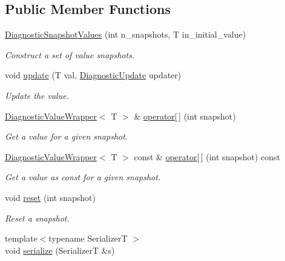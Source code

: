 \subsection*{Public Member Functions}
\begin{DoxyCompactItemize}
\item 
\hyperlink{structvt_1_1runtime_1_1component_1_1detail_1_1_diagnostic_snapshot_values_aed694eb0b124fda6f746855e83965a95}{Diagnostic\+Snapshot\+Values} (int n\+\_\+snapshots, T in\+\_\+initial\+\_\+value)
\begin{DoxyCompactList}\small\item\em Construct a set of value snapshots. \end{DoxyCompactList}\item 
void \hyperlink{structvt_1_1runtime_1_1component_1_1detail_1_1_diagnostic_snapshot_values_aeb6c8d74a72eba5610ba7d2ba966b91f}{update} (T val, \hyperlink{namespacevt_1_1runtime_1_1component_a896637e6e183a909a17bfd8d3943c206}{Diagnostic\+Update} updater)
\begin{DoxyCompactList}\small\item\em Update the value. \end{DoxyCompactList}\item 
\hyperlink{structvt_1_1runtime_1_1component_1_1detail_1_1_diagnostic_value_wrapper}{Diagnostic\+Value\+Wrapper}$<$ T $>$ \& \hyperlink{structvt_1_1runtime_1_1component_1_1detail_1_1_diagnostic_snapshot_values_a40036bbc9c217da754036c58bcce91b5}{operator\mbox{[}$\,$\mbox{]}} (int snapshot)
\begin{DoxyCompactList}\small\item\em Get a value for a given snapshot. \end{DoxyCompactList}\item 
\hyperlink{structvt_1_1runtime_1_1component_1_1detail_1_1_diagnostic_value_wrapper}{Diagnostic\+Value\+Wrapper}$<$ T $>$ const  \& \hyperlink{structvt_1_1runtime_1_1component_1_1detail_1_1_diagnostic_snapshot_values_a59ea89a8ada16ca5e96e10f418647963}{operator\mbox{[}$\,$\mbox{]}} (int snapshot) const
\begin{DoxyCompactList}\small\item\em Get a value as const for a given snapshot. \end{DoxyCompactList}\item 
void \hyperlink{structvt_1_1runtime_1_1component_1_1detail_1_1_diagnostic_snapshot_values_ac8bd81d164c5928dfd4213ddfd0d0206}{reset} (int snapshot)
\begin{DoxyCompactList}\small\item\em Reset a snapshot. \end{DoxyCompactList}\item 
{\footnotesize template$<$typename SerializerT $>$ }\\void \hyperlink{structvt_1_1runtime_1_1component_1_1detail_1_1_diagnostic_snapshot_values_a7aafbfe1b3ce5dd2351d504a60512691}{serialize} (SerializerT \&s)
\end{DoxyCompactItemize}
